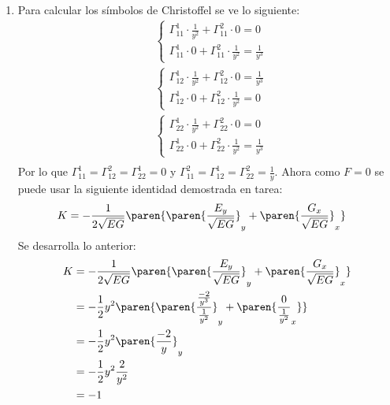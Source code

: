 \documentclass{homework}
\begin{document}
\begin{sol}
    \begin{enumerate}
        \item Para calcular los símbolos de Christoffel se ve lo siguiente:
              \begin{align*}
                   & \begin{cases}
                      \Gamma^1_{1 1}\cdot\frac1{y^2}+\Gamma^2_{1 1}\cdot 0=0 \\
                      \Gamma^1_{1 1}\cdot 0+\Gamma^2_{1 1}\cdot \frac1{y^2}=\frac1{y^3}
                  \end{cases} \\
                   & \begin{cases}
                      \Gamma^1_{1 2}\cdot \frac1{y^2}+\Gamma^2_{1 2}\cdot 0=\frac1{y^3} \\
                      \Gamma^1_{1 2}\cdot 0+\Gamma^2_{1 2}\cdot \frac1{y^2}=0
                  \end{cases} \\
                   & \begin{cases}
                      \Gamma^1_{2 2}\cdot \frac1{y^2}+\Gamma^2_{2 2}\cdot 0=0 \\
                      \Gamma^1_{2 2}\cdot 0+\Gamma^2_{2 2}\cdot \frac1{y^2}=\frac1{y^3}
                  \end{cases} \\
              \end{align*}
            Por lo que \(\Gamma^1_{1 1}=\Gamma^2_{1 2}=\Gamma^1_{2 2}=0\) y \(\Gamma^2_{1 1}=\Gamma^1_{1 2}=\Gamma^2_{2 2}=\frac1y\). Ahora como \(F=0\) se puede usar la siguiente identidad demostrada en tarea:
            \begin{align*}
                K&=-\frac1{2\sqrt{EG}}\paren{\paren{\frac{E_y}{\sqrt{EG}}}_y+\paren{\frac{G_x}{\sqrt{EG}}}_x}
            \end{align*}
            Se desarrolla lo anterior:
            \begin{align*}
                K&=-\frac1{2\sqrt{EG}}\paren{\paren{\frac{E_y}{\sqrt{EG}}}_y+\paren{\frac{G_x}{\sqrt{EG}}}_x}\\
                &=-\frac12y^2\paren{\paren{\dfrac{\frac{-2}{y^3}}{\frac1{y^2}}}_y+\paren{\dfrac{0}{\frac1{y^2}}_x}}\\
                &=-\frac12y^2\paren{\dfrac{-2}{y}}_y\\
                &=-\frac12y^2\dfrac{2}{y^2}\\
                &=-1\\
            \end{align*}
    \end{enumerate}
\end{sol}


%     
\end{document}
